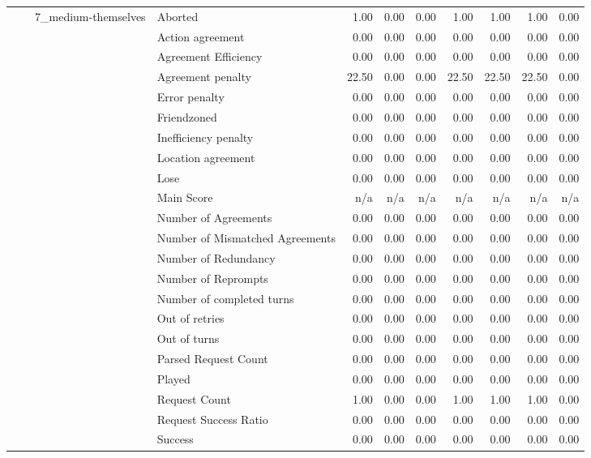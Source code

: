 \begin{tabular}{llllrrrrrrr}
 &  & \multirow[t]{27}{*}{7_medium-themselves} & Aborted & 1.00 & 0.00 & 0.00 & 1.00 & 1.00 & 1.00 & 0.00 \\
 &  &  & Action agreement & 0.00 & 0.00 & 0.00 & 0.00 & 0.00 & 0.00 & 0.00 \\
 &  &  & Agreement Efficiency & 0.00 & 0.00 & 0.00 & 0.00 & 0.00 & 0.00 & 0.00 \\
 &  &  & Agreement penalty & 22.50 & 0.00 & 0.00 & 22.50 & 22.50 & 22.50 & 0.00 \\
 &  &  & Error penalty & 0.00 & 0.00 & 0.00 & 0.00 & 0.00 & 0.00 & 0.00 \\
 &  &  & Friendzoned & 0.00 & 0.00 & 0.00 & 0.00 & 0.00 & 0.00 & 0.00 \\
 &  &  & Inefficiency penalty & 0.00 & 0.00 & 0.00 & 0.00 & 0.00 & 0.00 & 0.00 \\
 &  &  & Location agreement & 0.00 & 0.00 & 0.00 & 0.00 & 0.00 & 0.00 & 0.00 \\
 &  &  & Lose & 0.00 & 0.00 & 0.00 & 0.00 & 0.00 & 0.00 & 0.00 \\
 &  &  & Main Score & n/a & n/a & n/a & n/a & n/a & n/a & n/a \\
 &  &  & Number of Agreements & 0.00 & 0.00 & 0.00 & 0.00 & 0.00 & 0.00 & 0.00 \\
 &  &  & Number of Mismatched Agreements & 0.00 & 0.00 & 0.00 & 0.00 & 0.00 & 0.00 & 0.00 \\
 &  &  & Number of Redundancy & 0.00 & 0.00 & 0.00 & 0.00 & 0.00 & 0.00 & 0.00 \\
 &  &  & Number of Reprompts & 0.00 & 0.00 & 0.00 & 0.00 & 0.00 & 0.00 & 0.00 \\
 &  &  & Number of completed turns & 0.00 & 0.00 & 0.00 & 0.00 & 0.00 & 0.00 & 0.00 \\
 &  &  & Out of retries & 0.00 & 0.00 & 0.00 & 0.00 & 0.00 & 0.00 & 0.00 \\
 &  &  & Out of turns & 0.00 & 0.00 & 0.00 & 0.00 & 0.00 & 0.00 & 0.00 \\
 &  &  & Parsed Request Count & 0.00 & 0.00 & 0.00 & 0.00 & 0.00 & 0.00 & 0.00 \\
 &  &  & Played & 0.00 & 0.00 & 0.00 & 0.00 & 0.00 & 0.00 & 0.00 \\
 &  &  & Request Count & 1.00 & 0.00 & 0.00 & 1.00 & 1.00 & 1.00 & 0.00 \\
 &  &  & Request Success Ratio & 0.00 & 0.00 & 0.00 & 0.00 & 0.00 & 0.00 & 0.00 \\
 &  &  & Success & 0.00 & 0.00 & 0.00 & 0.00 & 0.00 & 0.00 & 0.00 \\

\end{tabular}
